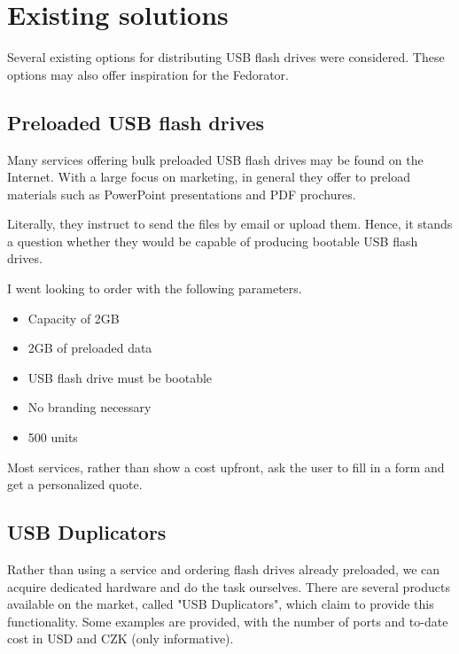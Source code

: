     \section{Existing solutions}
        Several existing options for distributing USB flash drives were considered.  These options may also offer inspiration for the Fedorator.
        
        \subsection{Preloaded USB flash drives}
            Many services offering bulk preloaded USB flash drives may be found on the Internet.  With a large focus on marketing, in general they offer to preload materials such as PowerPoint presentations and PDF prochures\cite{flashbay-data-preloading}.
            
            Literally, they instruct to send the files by email or upload them.  Hence, it stands a question whether they would be capable of producing bootable USB flash drives.
            
            I went looking to order with the following parameters.
            \begin{itemize}
                \item Capacity of 2GB
                \item 2GB of preloaded data
                \item USB flash drive must be bootable
                \item No branding necessary
                \item 500 units
            \end{itemize}
            
            Most services, rather than show a cost upfront, ask the user to fill in a form and get a personalized quote.
            
        
        \subsection{USB Duplicators}
            Rather than using a service and ordering flash drives already preloaded, we can acquire dedicated hardware and do the task ourselves.  There are several products available on the market, called "USB Duplicators", which claim to provide this functionality.  Some examples are provided, with the number of ports and to-date cost in USD and CZK (only informative).
            
